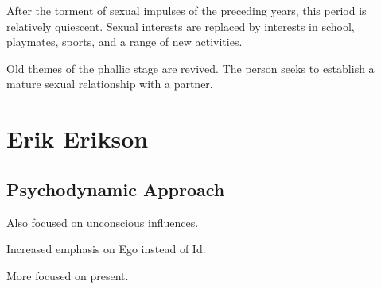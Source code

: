 \begin{coloredlist}
\begin{coloredlist}
\begin{coloredlist}
            \end{coloredlist}
            \item {}
            \begin{coloredlist}
                \item After the torment of sexual impulses of the preceding years, this period is relatively quiescent. Sexual interests are replaced by interests in school, playmates, sports, and a range of new activities. 
            \end{coloredlist}
            \item {}
            \begin{coloredlist}
                \item Old themes of the phallic stage are revived. The person seeks to establish a mature sexual relationship with a partner.
            \end{coloredlist}
        \end{coloredlist}
    \end{coloredlist}

\section{Erik Erikson}

    \subsection{Psychodynamic Approach}

    \begin{coloredlist}
        \item Also focused on unconscious influences.
        \item Increased emphasis on Ego instead of Id.
        \item More focused on present.
    \end{coloredlist}

